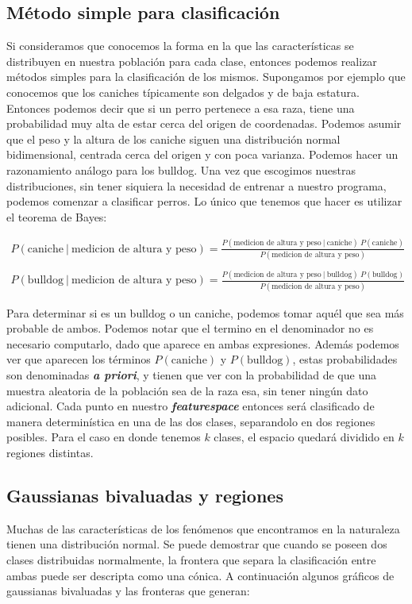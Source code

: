 \subsection{Método simple para clasificación}
Si consideramos que conocemos la forma en la que las características se distribuyen en nuestra población para cada clase, entonces podemos realizar métodos simples para la clasificación de los mismos. Supongamos por ejemplo que conocemos que los caniches típicamente son delgados y de baja estatura. Entonces podemos decir que si un perro pertenece a esa raza, tiene una probabilidad muy alta de estar cerca del origen de coordenadas. Podemos asumir que el peso y la altura de los caniche siguen una distribución normal bidimensional, centrada cerca del origen y con poca varianza. Podemos hacer un razonamiento análogo para los bulldog. Una vez que escogimos nuestras distribuciones, sin tener siquiera la necesidad de entrenar a nuestro programa, podemos comenzar a clasificar perros. Lo único que tenemos que hacer es utilizar el teorema de Bayes:

\begin{align*}P(\textrm{caniche} \ | \ \textrm{medicion de altura y peso}) = \frac{P(\textrm{medicion de altura y peso} \ | \ \textrm{caniche}) \ P(\textrm{caniche})}{P(\textrm{medicion de altura y peso})} \\ \\
P(\textrm{bulldog} \ | \ \textrm{medicion de altura y peso}) = \frac{P(\textrm{medicion de altura y peso} \ | \ \textrm{bulldog}) \ P(\textrm{bulldog})}{P(\textrm{medicion de altura y peso})}\end{align*}

Para determinar si es un bulldog o un caniche, podemos tomar aquél que sea más probable de ambos. Podemos notar que el termino en el denominador no es necesario computarlo, dado que aparece en ambas expresiones. Además podemos ver que aparecen los términos $P(\textrm{caniche})$ y $P(\textrm{bulldog})$, estas probabilidades son denominadas \textbf{\textit{a priori}}, y tienen que ver con la probabilidad de que una muestra aleatoria de la población sea de la raza esa, sin tener ningún dato adicional. Cada punto en nuestro \textbf{\textit{featurespace}} entonces será clasificado de manera determinística en una de las dos clases, separandolo en dos regiones posibles. Para el caso en donde tenemos $k$ clases, el espacio quedará dividido en $k$ regiones distintas.

\subsection{Gaussianas bivaluadas y regiones}
Muchas de las características de los fenómenos que encontramos en la naturaleza tienen una distribución normal. Se puede demostrar que cuando se poseen dos clases distribuidas normalmente, la frontera que separa la clasificación entre ambas puede ser descripta como una cónica. A continuación algunos gráficos de gaussianas bivaluadas y las fronteras que generan:


